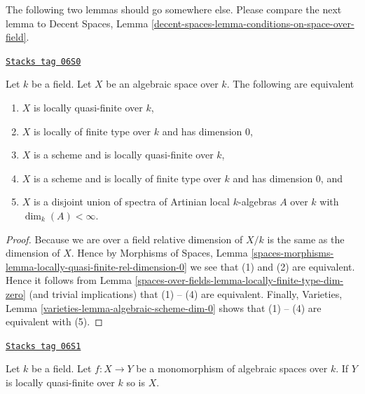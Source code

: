 The following two lemmas should go somewhere else.
Please compare the next lemma to
Decent Spaces, Lemma \ref{decent-spaces-lemma-conditions-on-space-over-field}.

\begin{lemma}
\label{spaces-over-fields-lemma-locally-quasi-finite-over-field}
\href{https://stacks.math.columbia.edu/tag/06S0}{\texttt{Stacks tag 06S0}}

Let $k$ be a field. Let $X$ be an algebraic space over $k$.
The following are equivalent
\begin{enumerate}
\item $X$ is locally quasi-finite over $k$,
\item $X$ is locally of finite type over $k$ and has dimension $0$,
\item $X$ is a scheme and is locally quasi-finite over $k$,
\item $X$ is a scheme and is locally of finite type over $k$ and has
dimension $0$, and
\item $X$ is a disjoint union of spectra of Artinian local $k$-algebras
$A$ over $k$ with $\dim_k(A) < \infty$.
\end{enumerate}
\end{lemma}

\begin{proof}
Because we are over a field relative dimension of $X/k$ is the same as
the dimension of $X$. Hence by
Morphisms of Spaces,
Lemma \ref{spaces-morphisms-lemma-locally-quasi-finite-rel-dimension-0}
we see that (1) and (2) are equivalent. Hence it follows from
Lemma \ref{spaces-over-fields-lemma-locally-finite-type-dim-zero}
(and trivial implications) that (1) -- (4) are equivalent.
Finally,
Varieties, Lemma \ref{varieties-lemma-algebraic-scheme-dim-0}
shows that (1) -- (4) are equivalent with (5).
\end{proof}

\begin{lemma}
\label{spaces-over-fields-lemma-mono-towards-locally-quasi-finite-over-field}
\href{https://stacks.math.columbia.edu/tag/06S1}{\texttt{Stacks tag 06S1}}

Let $k$ be a field. Let $f : X \to Y$ be a monomorphism of algebraic spaces
over $k$. If $Y$ is locally quasi-finite over $k$ so is $X$.
\end{lemma}

